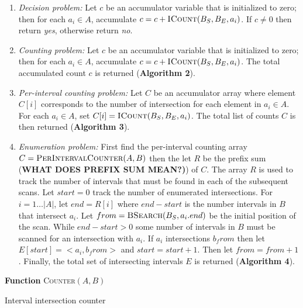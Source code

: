 \documentclass{bioinfo}
\begin{document}
	\begin{enumerate}

		\item
		{\em Decision problem:} Let $c$ be an accumulator variable that is
		initialized to zero; then for each $a_i \in A$, accumulate $c = c +
		\textsc{ICount}(B_S,B_E,a_i)$.  If $c\ne0$ then return {\em yes}, otherwise
		return {\em no}.

		\item
		{\em Counting problem:}  Let $c$ be an accumulator variable that is
		initialized to zero; then for each $a_i \in A$, accumulate $c = c +
		\textsc{ICount}(B_S,B_E,a_i)$.  The total accumulated count $c$ is 
		returned (\textbf{Algorithm 2}).

		\item
		{\em Per-interval counting problem:} Let $C$ be an accumulator
		array where element $C[i]$ corresponds to the number of
		intersection for each element in $a_i\in A$.  For each $a_i \in A$,
		set $C[i]=\textsc{ICount}(B_S,B_E,a_i)$.  The total list of counts $C$ is then
		returned (\textbf{Algorithm 3}).

		\item
		{\em Enumeration problem:}
		First find the per-interval counting array $C=\textsc{PerIntervalCounter}(A,B)$
		then the let $R$ be the prefix sum (\textbf{WHAT DOES PREFIX SUM MEAN?)}) of $C$. The array $R$ is used to track the
		number of intervals that must be found in each of the subsequent scans.  Let
		$start = 0$ track the number of enumerated intersections.
		For $i=1\dots|A|$, let $end = R[i]$ where $end - start$ is the number intervals
		in $B$ that intersect $a_i$.  Let $from=\textsc{BSearch}(B_S, a_i.end)$ be
		the initial position of the scan.  While $end - start > 0$ some number of
		intervals in $B$ must be scanned for an intersection with $a_i$.  If $a_i$
		intersections $b_from$ then let $E[start] = <a_i, b_from>$ and 
		$start=start+1$.  Then let $from = from +1$.  Finally, the total set of
		intersecting intervals $E$ is returned (\textbf{Algorithm 4}).
	\end{enumerate}
	
	\begin{algorithm}[h]
		\DontPrintSemicolon
		\footnotesize
		\BlankLine
		\textbf{Function} \textsc{Counter}$(A,B)$
		\caption{Interval intersection counter}
	\end{algorithm}
\end{document}
